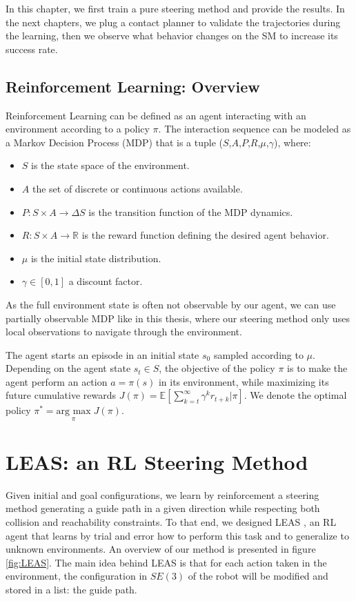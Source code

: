 In this chapter, we first train a pure steering method and provide the results. 
In the next chapters, we plug a contact planner to validate the trajectories during the learning, then we observe what behavior changes on the SM to increase its success rate.


\subsection{Reinforcement Learning: Overview}

Reinforcement Learning can be defined as an agent interacting with an environment according to a policy $\pi$. 
The interaction sequence can be modeled as a Markov Decision Process (MDP) that is a tuple ($S$,$A$,$P$,$R$,$\mu$,$\gamma$), where:
\begin{itemize}
    \item $S$ is the state space of the environment.
    \item $A$ the set of discrete or continuous actions available.
    \item $P: S \times A \rightarrow \Delta S$ is the transition function of the MDP dynamics.
    \item $R: S \times A \rightarrow \mathbb{R}$ is the reward function defining the desired agent behavior.
    \item $\mu$ is the initial state distribution.
    \item $\gamma \in [0,1]$ a discount factor.
\end{itemize}
As the full environment state is often not observable by our agent, we can use partially observable MDP like in this thesis, where our steering method only uses local observations to navigate through the environment.

The agent starts an episode in an initial state $s_0$ sampled according to $\mu$.
Depending on the agent state $s_t \in S$, the objective of the policy $\pi$ is to make the agent perform an action $a=\pi(s)$ in its environment, while maximizing its future cumulative rewards $J(\pi) = \mathbb{E}[\sum_{k=t}^{\infty} \gamma^k r_{t+k} | \pi]$.
We denote the optimal policy $\pi^* = \underset{\pi}{\mbox{arg max}} \; J(\pi)$.




\section{LEAS: an RL Steering Method\label{subsec:leas-RL}}
Given initial and goal configurations, we learn by reinforcement a steering method generating a guide path in a given direction while respecting both collision and reachability constraints. 
To that end, we designed LEAS \cite{LEAS}, an RL agent that learns by trial and error how to perform this task and to generalize to unknown environments. An overview of our method is presented in figure \ref{fig:LEAS}. The main idea behind LEAS is that for each action taken in the environment, the configuration in $SE(3)$ of the robot will be modified and stored in a list: the guide path.

